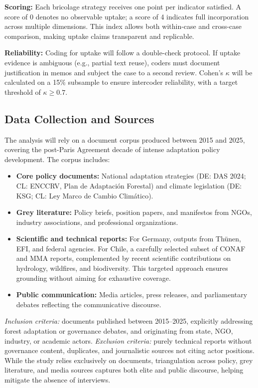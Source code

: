 \textbf{Scoring:}  
Each bricolage strategy receives one point per indicator satisfied. A score of 0 
denotes no observable uptake; a score of 4 indicates full incorporation across 
multiple dimensions. This index allows both within-case and cross-case comparison, 
making uptake claims transparent and replicable.

\textbf{Reliability:}  
Coding for uptake will follow a double-check protocol. If uptake evidence is 
ambiguous (e.g., partial text reuse), coders must document justification in 
memos and subject the case to a second review. Cohen’s $\kappa$ will be 
calculated on a 15\% subsample to ensure intercoder reliability, with a 
target threshold of $\kappa \geq 0.7$.

\subsection*{Data Collection and Sources}
The analysis will rely on a document corpus produced between 2015 and 2025, 
covering the post-Paris Agreement decade of intense adaptation policy development. 
The corpus includes:

\begin{itemize}
    \item \textbf{Core policy documents:} National adaptation strategies 
    (DE: DAS 2024; CL: ENCCRV, Plan de Adaptación Forestal) and climate legislation 
    (DE: KSG; CL: Ley Marco de Cambio Climático).
    \item \textbf{Grey literature:} Policy briefs, position papers, and manifestos 
    from NGOs, industry associations, and professional organizations.
    \item \textbf{Scientific and technical reports:} For Germany, outputs from Thünen, EFI, and 
    federal agencies. For Chile, a carefully selected subset of CONAF and MMA reports, complemented 
    by recent scientific contributions on hydrology, wildfires, and biodiversity. 
    This targeted approach ensures grounding without aiming for exhaustive coverage.
    \item \textbf{Public communication:} Media articles, press releases, and 
    parliamentary debates reflecting the communicative discourse.
\end{itemize}

\textit{Inclusion criteria:} documents published between 2015–2025, explicitly addressing 
forest adaptation or governance debates, and originating from state, NGO, industry, or academic actors.  
\textit{Exclusion criteria:} purely technical reports without governance content, duplicates, 
and journalistic sources not citing actor positions.
\smallskip
While the study relies exclusively on documents, triangulation across policy, 
grey literature, and media sources captures both elite and public discourse, 
helping mitigate the absence of interviews.

